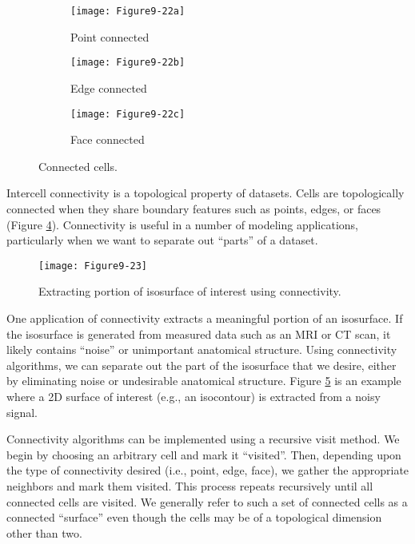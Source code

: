 \begin{figure}[htb]
	\begin{subfigure}[h]{0.32\linewidth}
		\texttt{[image: Figure9-22a]}
		\captionsetup{justification=centering}
		\caption*{Point connected}
		\label{fig:Figure9-22a}
	\end{subfigure}
	\hfill
	\begin{subfigure}[h]{0.32\linewidth}
		\texttt{[image: Figure9-22b]}
		\captionsetup{justification=centering}
		\caption*{Edge connected}
		\label{fig:Figure9-22b}
	\end{subfigure}
	\begin{subfigure}[h]{0.32\linewidth}
		\texttt{[image: Figure9-22c]}
		\captionsetup{justification=centering}
		\caption*{Face connected}
		\label{fig:Figure9-22c}
	\end{subfigure}
	\caption{Connected cells.}\label{fig:Figure9-22}
\end{figure}

Intercell connectivity is a topological property of datasets. Cells are topologically connected when they share boundary features such as points, edges, or faces (Figure \ref{fig:Figure9-22}). Connectivity is useful in a number of modeling applications, particularly when we want to separate out ``parts'' of a dataset.

\begin{figure}[!htb]
	\centering
	\texttt{[image: Figure9-23]}
	\caption{Extracting portion of isosurface of interest using connectivity.}
	\label{fig:Figure9-23}
\end{figure}

One application of connectivity extracts a meaningful portion of an isosurface. If the isosurface is generated from measured data such as an MRI or CT scan, it likely contains ``noise'' or unimportant anatomical structure. Using connectivity algorithms, we can separate out the part of the isosurface that we desire, either by eliminating noise or undesirable anatomical structure. Figure \ref{fig:Figure9-23} is an example where a 2D surface of interest (e.g., an isocontour) is extracted from a noisy signal.

Connectivity algorithms can be implemented using a recursive visit method. We begin by choosing an arbitrary cell and mark it ``visited''. Then, depending upon the type of connectivity desired (i.e., point, edge, face), we gather the appropriate neighbors and mark them visited. This process repeats recursively until all connected cells are visited. We generally refer to such a set of connected cells as a connected ``surface'' even though the cells may be of a topological dimension other than two.

